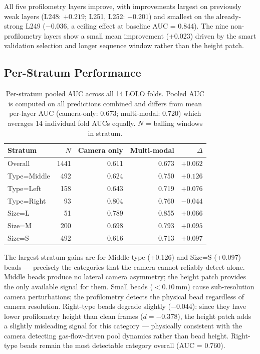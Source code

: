 \documentclass[12pt, letterpaper]{article}
\begin{document}
All five profilometry layers improve, with improvements largest
on previously weak layers (L248: $+0.219$; L251, L252: $+0.201$)
and smallest on the already-strong L249 ($-0.036$, a ceiling
effect at baseline AUC = 0.844). The nine non-profilometry
layers show a small mean improvement (+0.023) driven by the
smart validation selection and longer sequence window rather
than the height patch.

\subsection{Per-Stratum Performance}

\begin{table}[H]
\centering
\caption{Per-stratum pooled AUC across all 14 LOLO folds.
Pooled AUC is computed on all predictions combined and differs
from mean per-layer AUC (camera-only: 0.673; multi-modal: 0.720)
which averages 14 individual fold AUCs equally.
$N$ = balling windows in stratum.}
\begin{tabular}{lrrrr}
\toprule
Stratum & $N$ & Camera only & Multi-modal & $\Delta$ \\
\midrule
Overall      & 1441 & 0.611 & 0.673 & $+0.062$ \\
\midrule
Type=Middle  &  492 & 0.624 & 0.750 & $+0.126$ \\
Type=Left    &  158 & 0.643 & 0.719 & $+0.076$ \\
Type=Right   &   93 & 0.804 & 0.760 & $-0.044$ \\
\midrule
Size=L       &   51 & 0.789 & 0.855 & $+0.066$ \\
Size=M       &  200 & 0.698 & 0.793 & $+0.095$ \\
Size=S       &  492 & 0.616 & 0.713 & $+0.097$ \\
\bottomrule
\end{tabular}
\end{table}

The largest stratum gains are for Middle-type (+0.126) and
Size=S (+0.097) beads — precisely the categories that the
camera cannot reliably detect alone. Middle beads produce no
lateral camera asymmetry; the height patch provides the only
available signal for them. Small beads ($< 0.10$\,mm) cause
sub-resolution camera perturbations; the profilometry detects
the physical bead regardless of camera resolution. Right-type
beads degrade slightly ($-0.044$): since they have lower
profilometry height than clean frames ($d = -0.378$), the height
patch adds a slightly misleading signal for this category —
physically consistent with the camera detecting gas-flow-driven
pool dynamics rather than bead height. Right-type beads remain
the most detectable category overall (AUC = 0.760).
\end{document}
